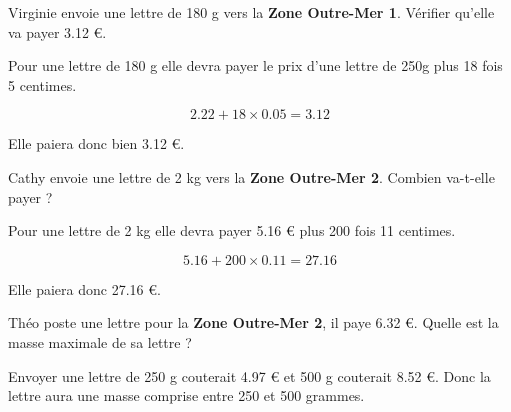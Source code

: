 \begin{questions}
	\question Virginie envoie une lettre de 180 g vers la \textbf{Zone Outre-Mer 1}. Vérifier qu'elle va payer \num{3.12} €.
	
	\begin{solution}
		Pour une lettre de 180 g elle devra payer le prix d'une lettre de 250g plus 18 fois 5 centimes.
		
		\begin{equation*}
			\num{2.22} + 18 \times \num{0.05} = \num{3.12}
		\end{equation*}
		
		Elle paiera donc bien \num{3.12} €.
	\end{solution}
	
	\question Cathy envoie une lettre de 2 kg vers la \textbf{Zone Outre-Mer 2}. Combien va-t-elle payer ?
	\begin{solution}
		Pour une lettre de 2 kg elle devra payer \num{5.16} € plus 200 fois 11 centimes.
		
		\begin{equation*}
		\num{5.16} + 200 \times \num{0.11} = \num{27.16}
		\end{equation*}
		
		Elle paiera donc \num{27.16} €.
	\end{solution}
	
	\question Théo poste une lettre pour la \textbf{Zone Outre-Mer 2}, il paye \num{6.32} €. Quelle est la masse maximale de sa lettre ?
	
	\begin{solution}
		Envoyer une lettre de 250 g couterait \num{4.97} € et 500 g couterait \num{8.52} €. Donc la lettre aura une masse comprise entre 250 et 500 grammes.
	\end{solution}
	

	

\end{questions}